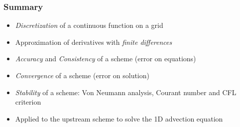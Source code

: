 \documentclass[aspectratio=149,9pt]{beamer}
\begin{document}
%
%
\begin{frame}
	\frametitle{Summary}
	\begin{itemize}
		\item \emph{Discretization} of a continuous function on a grid\vspace*{2ex}
		\item Approximation of derivatives with \emph{finite differences}\vspace*{2ex}
		\item \emph{Accuracy} and \emph{Consistency} of a scheme (error on equations)\vspace*{2ex}
		\item \emph{Convergence} of a scheme (error on solution)\vspace*{2ex}
		\item \emph{Stability} of a scheme: Von Neumann analysis, Courant number and CFL criterion\vspace*{2ex}
		\item Applied to the upstream scheme to solve the 1D advection equation
	\end{itemize}
\end{frame}
%
%	
\end{document}
